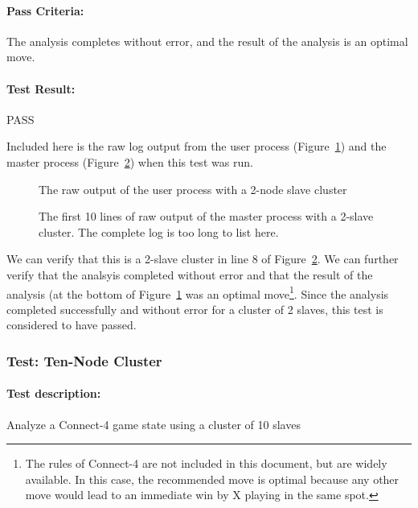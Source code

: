 \documentclass[pdftex,12pt,a4paper]{article}
\begin{document}
\paragraph{Pass Criteria:} The analysis completes without error, and the result of the analysis is an optimal move.

\paragraph{Test Result:} PASS

Included here is the raw log output from the user process (Figure~\ref{fig:duo-user-3}) and the master process (Figure~\ref{fig:duo-master-3}) when this test was run. 

\begin{figure}[h]

\caption{The raw output of the user process with a 2-node slave cluster}
\label{fig:duo-user-3}
\end{figure}

\begin{figure}[h]

\caption{The first 10 lines of raw output of the master process with a 2-slave cluster. The complete log is too long to list here.}
\label{fig:duo-master-3}
\end{figure}

We can verify that this is a 2-slave cluster in line 8 of Figure~\ref{fig:duo-master-3}. We can further verify that the analsyis completed without error and that the result of the analysis (at the bottom of Figure~\ref{fig:duo-user-3} was an optimal move\footnote{The rules of Connect-4 are not included in this document, but are widely available. In this case, the recommended move is optimal because any other move would lead to an immediate win by X playing in the same spot.}. Since the analysis completed successfully and without error for a cluster of 2 slaves, this test is considered to have passed.

\subsubsection{\textbf{Test:} Ten-Node Cluster}

\paragraph{Test description:} Analyze a Connect-4 game state using a cluster of 10 slaves
\end{document}
